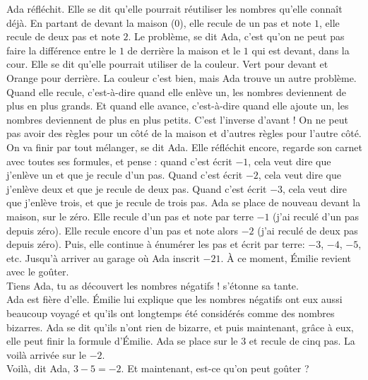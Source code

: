 Ada réfléchit. 
Elle se dit qu’elle pourrait réutiliser les nombres qu’elle connaît déjà. En partant de devant la maison ($0$), elle recule de un pas et note $1$, elle recule de deux pas et note $2$. 
Le problème, se dit Ada, c’est qu’on ne peut pas faire la différence entre le $1$ de derrière la maison et le $1$ qui est devant, dans la cour. 
Elle se dit qu’elle pourrait utiliser de la couleur. 
Vert pour devant et Orange pour derrière. 
La couleur c’est bien, mais Ada trouve un autre problème. 
Quand elle recule, c'est-à-dire quand elle enlève un, les nombres deviennent de plus en plus grands. Et quand elle avance, c’est-à-dire quand elle ajoute un, les nombres deviennent de plus en plus petits.
C’est l’inverse d’avant ! On ne peut pas avoir des règles pour un côté de la maison et d’autres règles pour l’autre côté. 
On va finir par tout mélanger, se dit Ada. 
Elle réfléchit encore, regarde son carnet avec toutes ses formules, et pense : quand c’est écrit $-1$, cela veut dire que j’enlève un et que je recule d’un pas. Quand c’est écrit $-2$, cela veut dire que j’enlève deux et que je recule de deux pas. Quand c’est écrit $-3$, cela veut dire que j’enlève trois, et que je recule de trois pas. 
Ada se place de nouveau devant la maison, sur le zéro. Elle recule d’un pas et note par terre $-1$ (j’ai reculé d’un pas depuis zéro). Elle recule encore d’un pas et note alors $-2$ (j’ai reculé de deux pas depuis zéro). Puis, elle continue à énumérer les pas et écrit par terre: $-3$, $-4$, $-5$, etc. 
Jusqu'à arriver au garage où Ada inscrit $-21$. 
À ce moment, Émilie revient avec le goûter.\\
\guillemotleft Tiens Ada, tu as découvert les nombres négatifs ! s’étonne sa tante. \guillemotright\\
Ada est fière d’elle. Émilie lui explique que les nombres négatifs ont eux aussi beaucoup voyagé et qu’ils ont longtemps été considérés comme des nombres bizarres. Ada se dit qu’ils n’ont rien de bizarre, et puis maintenant, grâce à eux, elle peut finir la formule d’Émilie. Ada se place sur le $3$ et recule de cinq pas. La voilà arrivée sur le $-2$.\\
\guillemotleft Voilà, dit Ada, $3 - 5 = -2$. Et maintenant, est-ce qu’on peut goûter ? \guillemotright

%    
